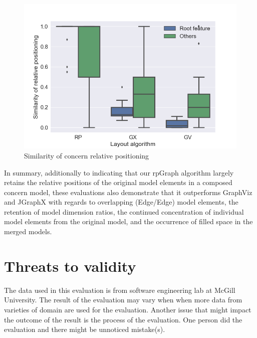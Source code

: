 \begin{figure}
\includegraphics[width=0.9\linewidth]{Evaluation/similarity_Concern.png}
	\caption{Similarity of concern relative positioning}
	\label{concern relative positioning}
\end{figure}

In summary, additionally to indicating that our rpGraph algorithm largely retains the relative positions of the original model elements in a composed concern model, these evaluations also demonstrate that it outperforms GraphViz and JGraphX with regards to overlapping (Edge/Edge) model elements, the retention of model dimension ratios, the continued concentration of individual model elements from the original model, and the occurrence of filled space in the merged models.

\section{Threats to validity}\label{threats to validity}
The data used in this evaluation is from software engineering lab at McGill University. The result of the evaluation may vary when when more data from varieties of domain are used for the evaluation. Another issue that might impact the outcome of the result is the process of the evaluation. One person did the evaluation and there might be unnoticed mistake(s).

